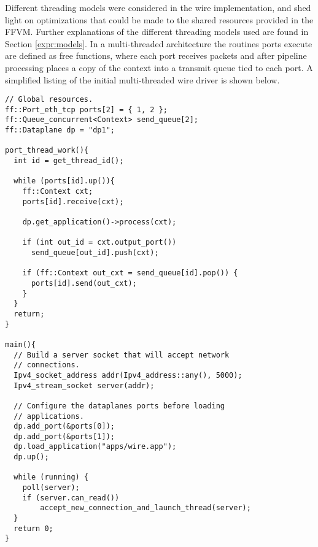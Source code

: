 Different threading models were considered in the wire implementation, and shed
light on optimizations that could be made to the shared resources provided in
the FFVM. Further explanations of the different threading models used are found
in Section \ref{expr:models}. In a multi-threaded architecture the routines
ports execute are defined as free functions, where each port receives packets
and after pipeline processing places a copy of the context into a transmit queue
tied to each port. A simplified listing of the initial multi-threaded wire
driver is shown below.

\begin{lstlisting}
// Global resources.
ff::Port_eth_tcp ports[2] = { 1, 2 };
ff::Queue_concurrent<Context> send_queue[2];
ff::Dataplane dp = "dp1";

port_thread_work(){
  int id = get_thread_id();

  while (ports[id].up()){
    ff::Context cxt;
    ports[id].receive(cxt);

    dp.get_application()->process(cxt);

    if (int out_id = cxt.output_port())
      send_queue[out_id].push(cxt);

    if (ff::Context out_cxt = send_queue[id].pop()) {
      ports[id].send(out_cxt);
    }
  }
  return;
}

main(){
  // Build a server socket that will accept network 
  // connections.
  Ipv4_socket_address addr(Ipv4_address::any(), 5000);
  Ipv4_stream_socket server(addr);

  // Configure the dataplanes ports before loading 
  // applications.
  dp.add_port(&ports[0]);
  dp.add_port(&ports[1]);
  dp.load_application("apps/wire.app");
  dp.up();

  while (running) {
  	poll(server);
  	if (server.can_read())
  		accept_new_connection_and_launch_thread(server);
  }
  return 0;
}
\end{lstlisting}


